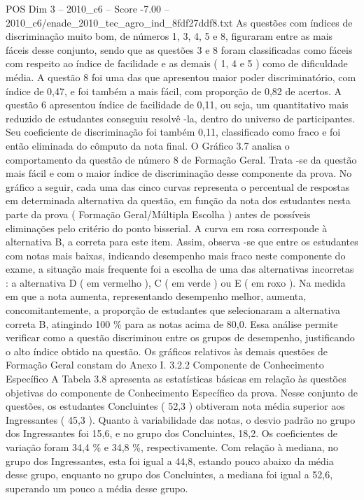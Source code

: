 \begin{textsample}{POS Dim 3 – 2010\_c6 – Score -7.00 – 2010\_c6/enade\_2010\_tec\_agro\_ind\_8fdf27ddf8.txt}
As questões com índices de discriminação muito bom, de números 1, 3, 4, 5 e 8, figuraram entre as mais fáceis desse conjunto, sendo que as questões 3 e 8 foram classificadas como fáceis com respeito ao índice de facilidade e as demais ( 1, 4 e 5 ) como de dificuldade média.
A questão 8 foi uma das que apresentou maior poder discriminatório, com índice de 0,47, e foi também a mais fácil, com proporção de 0,82 de acertos.
A questão 6 apresentou índice de facilidade de 0,11, ou seja, um quantitativo mais reduzido de estudantes conseguiu resolvê -la, dentro do universo de participantes.
Seu coeficiente de discriminação foi também 0,11, classificado como fraco e foi então eliminada do cômputo da nota final.
O Gráfico 3.7 analisa o comportamento da questão de número 8 de Formação Geral.
Trata -se da questão mais fácil e com o maior índice de discriminação desse componente da prova.
No gráfico a seguir, cada uma das cinco curvas representa o percentual de respostas em determinada alternativa da questão, em função da nota dos estudantes nesta parte da prova ( Formação Geral/Múltipla Escolha ) antes de possíveis eliminações pelo critério do ponto bisserial.
A curva em rosa corresponde à alternativa B, a correta para este item.
Assim, observa -se que entre os estudantes com notas mais baixas, indicando desempenho mais fraco neste componente do exame, a situação mais frequente foi a escolha de uma das alternativas incorretas : a alternativa D ( em vermelho ), C ( em verde ) ou E ( em roxo ).
Na medida em que a nota aumenta, representando desempenho melhor, aumenta, concomitantemente, a proporção de estudantes que selecionaram a alternativa correta B, atingindo 100 \% para as notas acima de 80,0.
Essa análise permite verificar como a questão discriminou entre os grupos de desempenho, justificando o alto índice obtido na questão.
Os gráficos relativos às demais questões de Formação Geral constam do Anexo I. 3.2.2 Componente de Conhecimento Específico A Tabela 3.8 apresenta as estatísticas básicas em relação às questões objetivas do componente de Conhecimento Específico da prova.
Nesse conjunto de questões, os estudantes Concluintes ( 52,3 ) obtiveram nota média superior aos Ingressantes ( 45,3 ).
Quanto à variabilidade das notas, o desvio padrão no grupo dos Ingressantes foi 15,6, e no grupo dos Concluintes, 18,2.
Os coeficientes de variação foram 34,4 \% e 34,8 \%, respectivamente.
Com relação à mediana, no grupo dos Ingressantes, esta foi igual a 44,8, estando pouco abaixo da média desse grupo, enquanto no grupo dos Concluintes, a mediana foi igual a 52,6, superando um pouco a média desse grupo.

\end{textsample}
